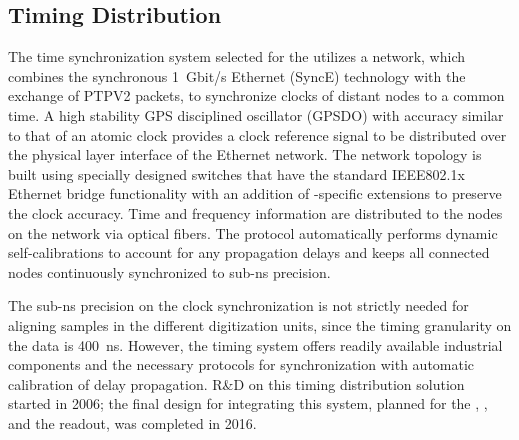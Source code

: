 \subsection{Timing Distribution}
\label{ssec:dp-tpcelec-wr}
The time synchronization system selected for the  utilizes a  network, which combines the synchronous \SI{1}{Gbit/s} Ethernet (SyncE) technology with the exchange of PTPV2 packets, to synchronize clocks of distant nodes to a common time. A high stability GPS disciplined oscillator (GPSDO) with  accuracy similar to that of an atomic clock provides a clock reference signal to be distributed over the physical layer interface of the  Ethernet network. The network topology is built using specially designed switches that have the standard IEEE802.1x Ethernet bridge functionality with an addition of -specific extensions to preserve the clock accuracy. Time and frequency information are distributed to the nodes on the  network via optical fibers. The  protocol automatically performs dynamic self-calibrations to account for any propagation delays and keeps all connected nodes continuously synchronized to sub-ns precision. 

The sub-ns %
precision on the clock synchronization is not strictly needed for aligning samples in the different  digitization units, since the %
timing granularity on the data is \SI{400}{ns}. However, the  timing system offers readily available industrial components and the necessary protocols %
for synchronization with automatic calibration of delay propagation. %
R\&D on this timing distribution solution started in 2006; the final design for integrating this system, %
planned for the , , and the  readout, was completed in 2016. 

